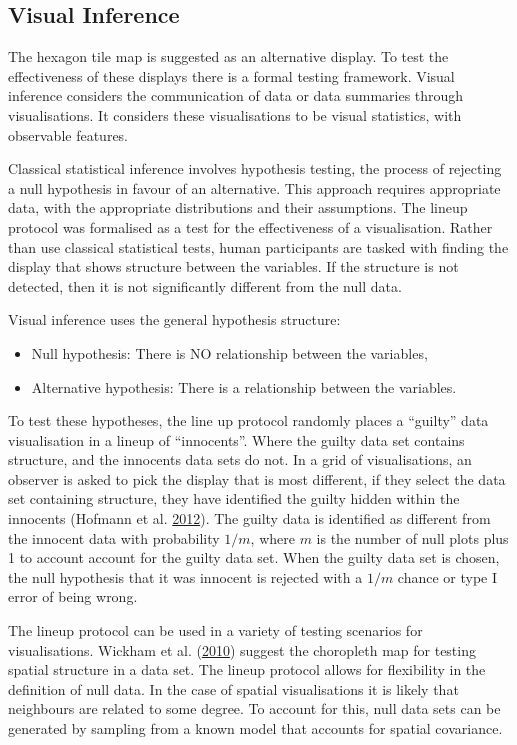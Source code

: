 \documentclass[conference,final,]{IEEEtran}
\begin{document}
\hypertarget{visual-inference}{%
\subsection{Visual Inference}\label{visual-inference}}

The hexagon tile map is suggested as an alternative display. To test the effectiveness of these displays there is a formal testing framework. Visual inference considers the communication of data or data summaries through visualisations. It considers these visualisations to be visual statistics, with observable features.

Classical statistical inference involves hypothesis testing, the process of rejecting a null hypothesis in favour of an alternative. This approach requires appropriate data, with the appropriate distributions and their assumptions.
The lineup protocol was formalised as a test for the effectiveness of a visualisation. Rather than use classical statistical tests, human participants are tasked with finding the display that shows structure between the variables. If the structure is not detected, then it is not significantly different from the null data.

Visual inference uses the general hypothesis structure:

\begin{itemize}
\item
  Null hypothesis: There is NO relationship between the variables,
\item
  Alternative hypothesis: There is a relationship between the variables.
\end{itemize}

To test these hypotheses, the line up protocol randomly places a ``guilty'' data visualisation in a lineup of ``innocents''. Where the guilty data set contains structure, and the innocents data sets do not.
In a grid of visualisations, an observer is asked to pick the display that is most different, if they select the data set containing structure, they have identified the guilty hidden within the innocents (Hofmann et al. \protect\hyperlink{ref-GTPCCD}{2012}).
The guilty data is identified as different from the innocent data with probability \(1/m\), where \(m\) is the number of null plots plus 1 to account account for the guilty data set. When the guilty data set is chosen, the null hypothesis that it was innocent is rejected with a \(1/m\) chance or type I error of being wrong.

The lineup protocol can be used in a variety of testing scenarios for visualisations. Wickham et al. (\protect\hyperlink{ref-GIIV}{2010}) suggest the choropleth map for testing spatial structure in a data set. The lineup protocol allows for flexibility in the definition of null data. In the case of spatial visualisations it is likely that neighbours are related to some degree. To account for this, null data sets can be generated by sampling from a known model that accounts for spatial covariance.
\end{document}

